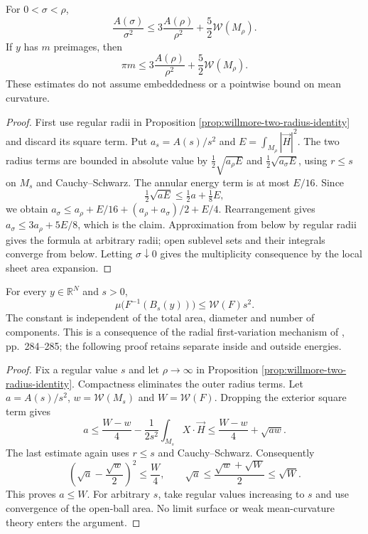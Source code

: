 \begin{proposition}\label{prop:willmore-local-area-comparison}
For $0<\sigma<\rho$,
\[
 \frac{A(\sigma)}{\sigma^2}\leq3\frac{A(\rho)}{\rho^2}+\frac52\mathcal W(M_\rho).
\]
If $y$ has $m$ preimages, then
\[
 \pi m\leq3\frac{A(\rho)}{\rho^2}+\frac52\mathcal W(M_\rho).
\]
These estimates do not assume embeddedness or a pointwise bound on mean curvature.
\end{proposition}
\begin{proof}
First use regular radii in Proposition \ref{prop:willmore-two-radius-identity} and discard its square term. Put $a_s=A(s)/s^2$ and $E=\int_{M_\rho}|\vec H|^2$. The two radius terms are bounded in absolute value by $\tfrac12\sqrt{a_\rho E}$ and $\tfrac12\sqrt{a_\sigma E}$, using $r\leq s$ on $M_s$ and Cauchy--Schwarz. The annular energy term is at most $E/16$. Since
\[
 \tfrac12\sqrt{aE}\leq\tfrac12a+\tfrac18E,
\]
we obtain $a_\sigma\leq a_\rho+E/16+(a_\rho+a_\sigma)/2+E/4$. Rearrangement gives $a_\sigma\leq3a_\rho+5E/8$, which is the claim. Approximation from below by regular radii gives the formula at arbitrary radii; open sublevel sets and their integrals converge from below. Letting $\sigma\downarrow0$ gives the multiplicity consequence by the local sheet area expansion.
\end{proof}

\begin{theorem}\label{thm:willmore-uniform-quadratic-area}
For every $y\in\mathbb R^N$ and $s>0$,
\[
 \mu\bigl(F^{-1}(B_s(y))\bigr)\leq\mathcal W(F)s^2.
\]
The constant is independent of the total area, diameter and number of components. This is a consequence of the radial first-variation mechanism of \cite{SimW93}, pp.~284--285; the following proof retains separate inside and outside energies.
\end{theorem}
\begin{proof}
Fix a regular value $s$ and let $\rho\to\infty$ in Proposition \ref{prop:willmore-two-radius-identity}. Compactness eliminates the outer radius terms. Let $a=A(s)/s^2$, $w=\mathcal W(M_s)$ and $W=\mathcal W(F)$. Dropping the exterior square term gives
\[
 a\leq\frac{W-w}{4}-\frac1{2s^2}\int_{M_s}X\cdot\vec H
 \leq\frac{W-w}{4}+\sqrt{aw}.
\]
The last estimate again uses $r\leq s$ and Cauchy--Schwarz. Consequently
\[
 \left(\sqrt a-\frac{\sqrt w}{2}\right)^2\leq\frac W4,
 \qquad \sqrt a\leq\frac{\sqrt w+\sqrt W}{2}\leq\sqrt W.
\]
This proves $a\leq W$. For arbitrary $s$, take regular values increasing to $s$ and use convergence of the open-ball area. No limit surface or weak mean-curvature theory enters the argument.
\end{proof}

